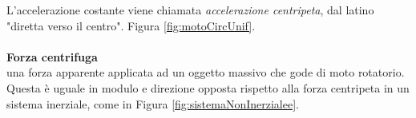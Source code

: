L'accelerazione costante viene chiamata \textit{accelerazione centripeta}, dal latino "diretta verso il centro". Figura \ref{fig:motoCircUnif}.

\paragraph{}
\textbf{Forza centrifuga}\\
\e una forza apparente applicata ad un oggetto massivo che gode di moto rotatorio. Questa è uguale in modulo e direzione opposta rispetto alla forza centripeta in un sistema inerziale, come in Figura \ref{fig:sistemaNonInerzialee}.

\def\R{2}      %
\def\t{0.1}    %
\def\p{0.05}   %
\def\P{1.3}    %
\def\r{0.24}   %
\def\L{0.7*\R} %
\def\H{2.0}    %
